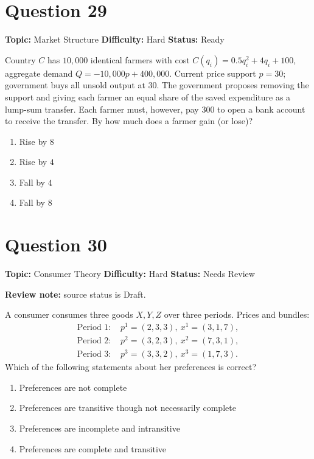 \documentclass[11pt]{article}
\begin{document}
\newpage

\section*{Question 29}


\noindent\textbf{Topic:} Market Structure \quad \textbf{Difficulty:} Hard \quad \textbf{Status:} Ready



Country $C$ has $10{,}000$ identical farmers with cost $C(q_i)=0.5q_i^{2}+4q_i+100$, aggregate demand $Q=-10{,}000p+400{,}000$. Current price support $p=30$; government buys all unsold output at $30$. The government proposes removing the support and giving each farmer an equal share of the saved expenditure as a lump-sum transfer. Each farmer must, however, pay $300$ to open a bank account to receive the transfer. By how much does a farmer gain (or lose)?
\begin{enumerate}[label=(\Alph*)]
\item Rise by $8$
\item Rise by $4$
\item Fall by $4$
\item Fall by $8$
\end{enumerate}

\newpage

\section*{Question 30}


\noindent\textbf{Topic:} Consumer Theory \quad \textbf{Difficulty:} Hard \quad \textbf{Status:} Needs Review

\par\noindent\textcolor{StatAmber}{\textbf{Review note:} source status is Draft.}


A consumer consumes three goods $X,Y,Z$ over three periods. Prices and bundles:
\[
\begin{aligned}
\text{Period 1: } & p^{1}=(2,3,3),\ x^{1}=(3,1,7),\\
\text{Period 2: } & p^{2}=(3,2,3),\ x^{2}=(7,3,1),\\
\text{Period 3: } & p^{3}=(3,3,2),\ x^{3}=(1,7,3).
\end{aligned}
\]
Which of the following statements about her preferences is correct?
\begin{enumerate}[label=(\Alph*)]
\item Preferences are not complete
\item Preferences are transitive though not necessarily complete
\item Preferences are incomplete and intransitive
\item Preferences are complete and transitive
\end{enumerate}
\end{document}
